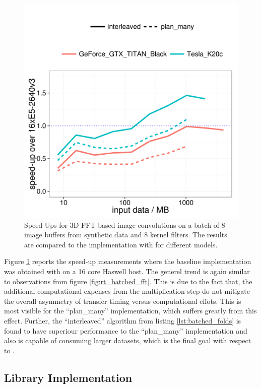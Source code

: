 \begin{figure}[hbt]
  \centering
    \includegraphics[width=\textwidth]{plots/batched_folds_gpu_speed_up}
  \caption{Speed-Ups for 3D FFT based image convolutions on a batch of 8 image buffers from synthetic data and 8 kernel filters. The results are compared to the \cpu{} implementation with \fftw{} for different \gpu{} models.}
  \label{fig:su_batched_fold}
\end{figure}

Figure \ref{fig:su_batched_fold} reports the speed-up measurements where the baseline \cpu{} implementation was obtained with \fftw{} on a 16 core Haswell host. The generel trend is again similar to observations from figure \ref{fig:rt_batched_fft}. This is due to the fact that, the additional computational expenses from the multiplication step do not mitigate the overall asymmetry of transfer timing versus computational effots. This is most visible for the ``plan\_many'' implementation, which suffers greatly from this effect. Further, the ``interleaved'' algorithm from listing \ref{lst:batched_folds} is found to have superiour performance to the ``plan\_many'' implementation and also is capable of consuming larger datasets, which is the final goal with respect to \lmvn{}. 
 
\clearpage
\subsection{Library Implementation}

